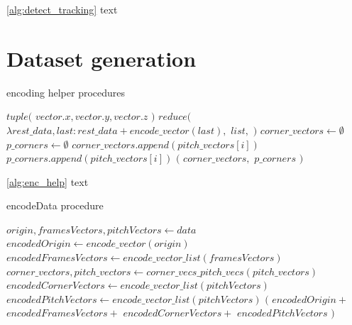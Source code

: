 \documentclass[
11pt,
twoside
]{report}
\begin{document}
\ref{alg:detect_tracking} text





\section{Dataset generation}


\begin{algorithm}[H]
\begin{algorithmic}
\caption{encoding helper procedures}\label{alg:enc_help}
    \Return $tuple($
        \State \indent $vector.x, vector.y, vector.z$
    \State $)$
\EndProcedure
{}
    \Return $reduce($
        \State \indent $\lambda rest\_data, last: rest\_data + encode\_vector(last),$
        \State \indent $list,$
        \State \indent \emptyset {}
    \State $)$
\EndProcedure
{}
    \State $corner\_vectors \gets \emptyset$
    \State $p\_corners \gets \emptyset$
            \State $corner\_vectors.append(pitch\_vectors[i])$
        \Else
            \State $p\_corners.append(pitch\_vectors[i])$
        \EndIf
    \EndFor
    \State
    \Return $($
        \State \indent $corner\_vectors,$
        \State \indent $p\_corners$
    \State $)$
\EndProcedure
\end{algorithmic}
\end{algorithm}


\ref{alg:enc_help} text


\begin{algorithm}[H]
\begin{algorithmic}
\caption{encodeData procedure}\label{alg:enc_data}
    \State $origin, framesVectors, pitchVectors \gets data$
    \State $encodedOrigin \gets encode\_vector(origin)$
    \State $encodedFramesVectors \gets encode\_vector\_list(framesVectors)$
    \State $corner\_vectors, pitch\_vectors \gets corner\_vecs\_pitch\_vecs(pitch\_vectors)$
    \State $encodedCornerVectors \gets encode\_vector\_list(pitchVectors)$
    \State $encodedPitchVectors \gets encode\_vector\_list(pitchVectors)$
    \State
    \Return $($
        \State \indent $encodedOrigin +$
        \State \indent $encodedFramesVectors +$
        \State \indent $encodedCornerVectors +$
        \State \indent $encodedPitchVectors$
    \State $)$
\EndProcedure
\end{algorithmic}
\end{algorithm}
\end{document}
